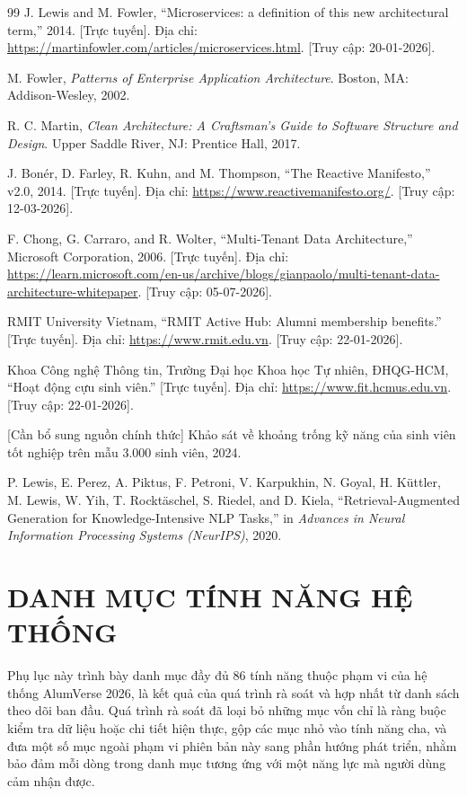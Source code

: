 \documentclass[12pt,a4paper,oneside]{report}
\begin{document}
\begin{thebibliography}{99}
 J. Lewis and M. Fowler, ``Microservices: a definition of this new architectural term,'' 2014. [Trực tuyến]. Địa chỉ: \url{https://martinfowler.com/articles/microservices.html}. [Truy cập: 20-01-2026].

 M. Fowler, \textit{Patterns of Enterprise Application Architecture}. Boston, MA: Addison-Wesley, 2002.

 R. C. Martin, \textit{Clean Architecture: A Craftsman's Guide to Software Structure and Design}. Upper Saddle River, NJ: Prentice Hall, 2017.

 J. Bonér, D. Farley, R. Kuhn, and M. Thompson, ``The Reactive Manifesto,'' v2.0, 2014. [Trực tuyến]. Địa chỉ: \url{https://www.reactivemanifesto.org/}. [Truy cập: 12-03-2026].

 F. Chong, G. Carraro, and R. Wolter, ``Multi-Tenant Data Architecture,'' Microsoft Corporation, 2006. [Trực tuyến]. Địa chỉ: \url{https://learn.microsoft.com/en-us/archive/blogs/gianpaolo/multi-tenant-data-architecture-whitepaper}. [Truy cập: 05-07-2026].

 RMIT University Vietnam, ``RMIT Active Hub: Alumni membership benefits.'' [Trực tuyến]. Địa chỉ: \url{https://www.rmit.edu.vn}. [Truy cập: 22-01-2026].

 Khoa Công nghệ Thông tin, Trường Đại học Khoa học Tự nhiên, ĐHQG-HCM, ``Hoạt động cựu sinh viên.'' [Trực tuyến]. Địa chỉ: \url{https://www.fit.hcmus.edu.vn}. [Truy cập: 22-01-2026].

 [Cần bổ sung nguồn chính thức] Khảo sát về khoảng trống kỹ năng của sinh viên tốt nghiệp trên mẫu 3.000 sinh viên, 2024.

 P. Lewis, E. Perez, A. Piktus, F. Petroni, V. Karpukhin, N. Goyal, H. Küttler, M. Lewis, W. Yih, T. Rocktäschel, S. Riedel, and D. Kiela, ``Retrieval-Augmented Generation for Knowledge-Intensive NLP Tasks,'' in \textit{Advances in Neural Information Processing Systems (NeurIPS)}, 2020.

\end{thebibliography}
\appendix
\chapter{DANH MỤC TÍNH NĂNG HỆ THỐNG}

Phụ lục này trình bày danh mục đầy đủ 86 tính năng thuộc phạm vi của hệ thống AlumVerse 2026, là kết quả của quá trình rà soát và hợp nhất từ danh sách theo dõi ban đầu. Quá trình rà soát đã loại bỏ những mục vốn chỉ là ràng buộc kiểm tra dữ liệu hoặc chi tiết hiện thực, gộp các mục nhỏ vào tính năng cha, và đưa một số mục ngoài phạm vi phiên bản này sang phần hướng phát triển, nhằm bảo đảm mỗi dòng trong danh mục tương ứng với một năng lực mà người dùng cảm nhận được.
\end{document}
